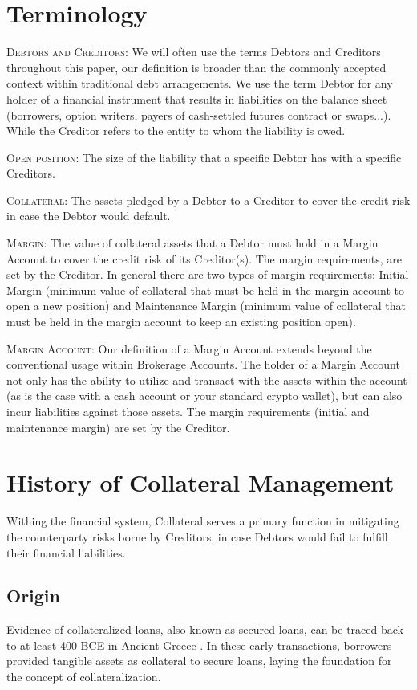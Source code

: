 \documentclass[sigconf,nonacm]{acmart}
\begin{document}
\section{Terminology}
\textsc{Debtors and Creditors:} We will often use the terms Debtors and Creditors throughout this paper,
our definition is broader than the commonly accepted context within traditional debt arrangements.
We use the term Debtor for any holder of a financial instrument that results in liabilities on the balance sheet 
(borrowers, option writers, payers of cash-settled futures contract or swaps...). 
While the Creditor refers to the entity to whom the liability is owed.

\textsc{Open position:} The size of the liability that a specific Debtor has with a specific Creditors.

\textsc{Collateral:} The assets pledged by a Debtor to a Creditor to cover the credit risk in case the Debtor would default.

\textsc{Margin:} The value of collateral assets that a Debtor must hold in a Margin Account to cover the credit risk of its Creditor(s).
The margin requirements, are set by the Creditor.
In general there are two types of margin requirements: Initial Margin (minimum value of collateral that must be held in the margin account to open a new position)
and Maintenance Margin (minimum value of collateral that must be held in the margin account to keep an existing position open).

\textsc{Margin Account:} Our definition of a Margin Account extends beyond the conventional usage within Brokerage Accounts. 
The holder of a Margin Account not only has the ability to utilize and transact with the assets within the account (as is the case with a cash account or your standard crypto wallet),
but can also incur liabilities against those assets. The margin requirements (initial and maintenance margin) are set by the Creditor.

\section{History of Collateral Management}
\label{subsec:history}

Withing the financial system, Collateral serves a primary function in mitigating the counterparty risks borne by Creditors, in case Debtors would fail to fulfill their financial liabilities.

\subsection{Origin}
Evidence of collateralized loans, also known as secured loans, can be traced back to at least 400 BCE in Ancient Greece  \cite{millett2002lending}.
In these early transactions, borrowers provided tangible assets as collateral to secure loans, laying the foundation for the concept of collateralization.
\end{document}
